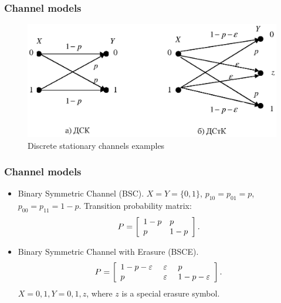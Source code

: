 \documentclass[14pt]{beamer}
\begin{document}
\begin{frame}
\frametitle{Channel models}
\begin{itemize}

\begin{figure}[ht]
\begin{minipage}{1.0\linewidth}
\includegraphics[width=1.0\textwidth]{fig5_2.eps}
\caption{Discrete stationary channels examples} \label{fig5_2}
\end{minipage}
\end{figure}

\end{itemize}
\end{frame}

\begin{frame}
\frametitle{Channel models}
\begin{itemize}
    \item Binary Symmetric Channel (BSC).
        $X = Y = \{0,1\}$,
        $p_{10} = p_{01} = p$, $p_{00} = p_{11} = 1 - p$.
        Transition probability matrix:
        \[
        P = \left[ {{\begin{array}{*{20}c}
         {1 - p} \hfill & p \hfill \\
         p \hfill & {1 - p} \hfill \\
        \end{array} }} \right].
        \]

    \pause \item
    Binary Symmetric Channel with Erasure (BSCE).
    \[
    P = \left[ {{\begin{array}{*{20}c}
     {1 - p - \varepsilon } \hfill \\
     p \hfill \\
    \end{array} }\mbox{ }{\begin{array}{*{20}c}
     \varepsilon \hfill \\
     \varepsilon \hfill \\
    \end{array} }\mbox{ }{\begin{array}{*{20}c}
     p \hfill \\
     {1 - p - \varepsilon } \hfill \\
    \end{array} }} \right].
    \]
    $X = {0,1}, Y = {0, 1, z}$, where $z$ is a special erasure symbol.

\end{itemize}
\end{frame}
\end{document}
